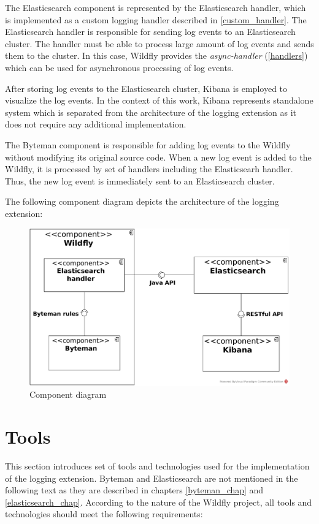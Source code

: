 \documentclass[12pt,oneside]{fithesis2}
\begin{document}
The Elasticsearch component is represented by the  Elasticsearch handler, which is implemented as a custom logging handler described in \ref{custom_handler}. The Elasticsearch handler is responsible for sending log events to an Elasticsearch cluster. The handler must be able to process large amount of log events and sends them to the cluster. In this case, Wildfly provides the \textit{async-handler} (\ref{handlers}) which can be used for asynchronous processing of log events.

After storing log events to the Elasticsearch cluster, Kibana is employed to visualize the log events. In the context of this work, Kibana represents standalone system which is separated from the architecture of the logging extension as it does not require any additional implementation.

The Byteman component is responsible for adding log events to the Wildfly without modifying its original source code. When a new log event is added to the Wildfly, it is processed by set of handlers including the Elasticsearh handler. Thus, the new log event is immediately sent to an Elasticsearch cluster.

The following component diagram depicts the architecture of the logging extension:

\begin{figure}[ht!]
	\centering
	\includegraphics[width=\textwidth]{images/component_diagram}
	\caption{Component diagram}
	\label{component_diagram}
\end{figure}

\section{Tools}
This section introduces set of tools and technologies used for the implementation of the logging extension. Byteman and Elasticsearch are not mentioned in the following text as they are described in chapters \ref{byteman_chap} and \ref{elasticsearch_chap}. According to the nature of the Wildfly project, all tools and technologies should meet the following requirements:
\end{document}

